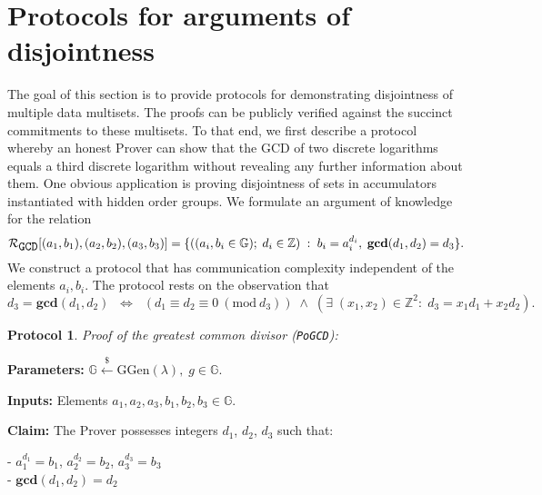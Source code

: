 \documentclass[11pt, lettersize, notitlepage, leqno, footskip=0.6cm]{article}
\newcommand{\bz}{\mathbb Z}
\newcommand{\LRA}{\Longleftrightarrow}
\newcommand{\mc}{\mathcal}
\newcommand{\mb}{\mathbb}
\newcommand{\mbf}{\mathbf}
\newcommand{\mr}{\mathrm}
\newcommand{\lamb}{\lambda}
\newcommand{\vs}{\vspace{-0.15cm}}
\newcommand{\Mod}[1]{\ (\mathrm{mod}\ #1)}
\newcommand{\GCD}{\mbf{gcd}}
\newtheorem{Prot}[Thm]{Protocol}
\numberwithin{equation}{section}
\begin{document}
\section{\fontsize{12}{12}\selectfont Protocols for arguments of disjointness}

The goal of this section is to provide protocols for demonstrating disjointness of multiple data multisets. The proofs can be publicly verified against the succinct commitments to these multisets. To that end, we first describe a protocol whereby an honest Prover can show that the GCD of two discrete logarithms equals a third discrete logarithm without revealing any further information about them. One obvious application is proving disjointness of sets in accumulators instantiated with hidden order groups. We formulate an argument of knowledge for the relation \vspace{-0.15cm} $$\mc{R}_{{\protect\verb|GCD|}}[(a_1,b_1),(a_2,b_2),(a_3,b_3)] = \{((a_i, b_i\in\mb{G});\;d_i\in\bz)\;:\; b_i = a_i^{d_i},\;\GCD(d_1,d_2)=d_3  \} .$$ We construct a protocol that has communication complexity independent of the elements $a_i, b_i$. The protocol rests on the observation that \vs $$d_3 = \GCD(d_1, d_2)\;\; \LRA \;\;(d_1\equiv d_2\equiv 0 \Mod{d_3})\;\wedge \; \left(\exists \; (x_1,x_2)\in \bz^2:\; d_3 = x_1d_1+x_2d_2  \right).$$
 

\begin{Prot} \normalfont \textit{Proof of the greatest common divisor} (\verb|PoGCD|):\end{Prot} \vspace{-0.3cm}

\noindent \textbf{Parameters:} $\mb{G}\xleftarrow{\$} \mr{GGen}(\lamb), \; g\in \mb{G}$.

\noindent \textbf{Inputs:} Elements $a_1, a_2, a_3, b_1, b_2, b_3 \in \mb{G}$.

\noindent \textbf{Claim:} The Prover possesses integers $d_1$, $d_2$, $d_3$ such that:

\noindent - $a_1^{d_1} = b_1$, $a_2^{d_2} = b_2$, $a_3^{d_3} = b_3$\\
\noindent - $\GCD(d_1, d_2) = d_2$
 
\end{document}

